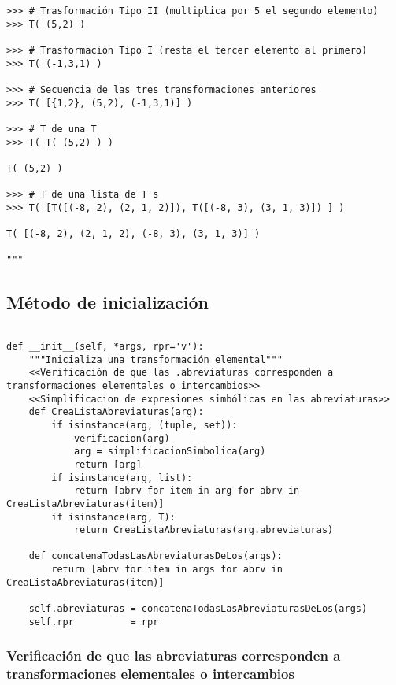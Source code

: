\documentclass[11pt]{report}
\begin{document}
\begin{verbatim}
>>> # Trasformación Tipo II (multiplica por 5 el segundo elemento)
>>> T( (5,2) )

>>> # Trasformación Tipo I (resta el tercer elemento al primero)
>>> T( (-1,3,1) )

>>> # Secuencia de las tres transformaciones anteriores
>>> T( [{1,2}, (5,2), (-1,3,1)] )

>>> # T de una T
>>> T( T( (5,2) ) )

T( (5,2) )

>>> # T de una lista de T's
>>> T( [T([(-8, 2), (2, 1, 2)]), T([(-8, 3), (3, 1, 3)]) ] )

T( [(-8, 2), (2, 1, 2), (-8, 3), (3, 1, 3)] )

"""
\end{verbatim}

\subsection{Método de inicialización}
\label{sec:orga5b4b94}

\begin{verbatim}

def __init__(self, *args, rpr='v'):
    """Inicializa una transformación elemental"""
    <<Verificación de que las .abreviaturas corresponden a transformaciones elementales o intercambios>>
    <<Simplificacion de expresiones simbólicas en las abreviaturas>>
    def CreaListaAbreviaturas(arg):
        if isinstance(arg, (tuple, set)):
            verificacion(arg)
            arg = simplificacionSimbolica(arg)
            return [arg]
        if isinstance(arg, list):
            return [abrv for item in arg for abrv in CreaListaAbreviaturas(item)]
        if isinstance(arg, T):
            return CreaListaAbreviaturas(arg.abreviaturas) 
    
    def concatenaTodasLasAbreviaturasDeLos(args):
        return [abrv for item in args for abrv in CreaListaAbreviaturas(item)]
    
    self.abreviaturas = concatenaTodasLasAbreviaturasDeLos(args)
    self.rpr          = rpr

\end{verbatim}

\subsubsection{Verificación de que las abreviaturas corresponden a transformaciones elementales o intercambios}
\label{sec:org1f54c22}
\end{document}

